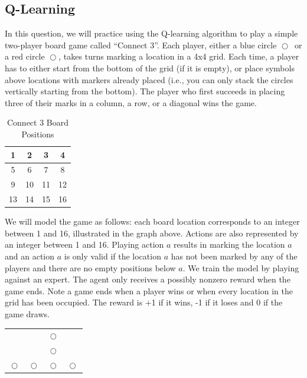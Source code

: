 \documentclass[11pt,addpoints,answers]{exam}
\def\rr{{\color{red}$\mathrel{\bigcirc}$}}
\def\bb{{\color{blue}$\mathrel{\bigcirc}$}}
\begin{document}
\clearpage
\subsection{Q-Learning}
\label{sec:q-learning}

\begin{questions}
\question
In this question, we will practice using the Q-learning algorithm to play a simple two-player board game called ``Connect 3''. Each player, either a blue circle \bb~or a red circle \rr, takes turns marking a location in a 4x4 grid. Each time, a player has to either start from the bottom of the grid (if it is empty), or place symbols above locations with markers already placed (i.e., you can only stack the circles vertically starting from the bottom). The player who first succeeds in placing three of their marks in a column, a row, or a diagonal wins the game.

\begin{table}[H]
\begin{center}
  \begin{tabular}{  c | c | c | c }
    1 & 2 & 3 & 4 \\ \hline
    5 & 6 & 7 & 8 \\ \hline
    9 & 10 & 11 & 12 \\ \hline
    13 & 14 & 15 & 16 \\
  \end{tabular}
 \caption{Connect 3 Board Positions}
\end{center}
\end{table}

We will model the game as follows: each board location corresponds to an integer between 1 and 16, illustrated in the graph above. Actions are also represented by an integer between 1 and 16. Playing action $a$ results in marking the location $a$ and an action $a$ is only valid if the location $a$ has not been marked by any of the players and there are no empty positions below $a$. We train the model by playing against an expert. The agent only receives a possibly nonzero reward when the game ends. Note a game ends when a player wins or when every location in the grid has been occupied. The reward is +1 if it wins, -1 if it loses and 0 if the game draws.

\begin{table}[H]
\begin{center}
  \begin{tabular}{  c | c | c | c }
      &   &   &   \\ \hline
      &   & \rr &   \\ \hline
      &   & \bb &   \\ \hline
    \rr & \bb & \bb & \rr \\ 
      

\end{tabular}
\end{center}
\end{table}
\end{questions}
\end{document}
